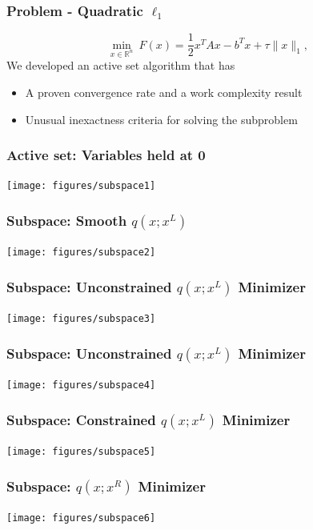 \documentclass{beamer}
\begin{document}
	\begin{frame}
		\frametitle{Problem - Quadratic $\ell_1$}
	\begin{equation*}
		\min_{x \in \mathbb{R}^n} \ F(x) = \frac{1}{2}x^T A x - b^T x +\tau \|x\|_1 ,
	\end{equation*}
	We developed an active set algorithm that has 
	\begin{itemize}
		\item A proven convergence rate and a work complexity result
		\item Unusual inexactness criteria for solving the subproblem 
	\end{itemize}
		\end{frame}


\begin{frame}
	\frametitle{Active set: Variables held at 0}
	\begin{center}
			\texttt{[image: figures/subspace1]}
	\end{center}
\end{frame}

\begin{frame}
	\frametitle{Subspace: Smooth $q(x;x^L)$}
		\begin{center}
				\texttt{[image: figures/subspace2]}
		\end{center}	
\end{frame}

\begin{frame}
	\frametitle{Subspace: Unconstrained $q(x;x^L)$ Minimizer}
		\begin{center}
				\texttt{[image: figures/subspace3]}
		\end{center}	
\end{frame}

\begin{frame}
	\frametitle{Subspace: Unconstrained $q(x;x^L)$ Minimizer}
		\begin{center}
				\texttt{[image: figures/subspace4]}
		\end{center}	
\end{frame}

\begin{frame}
	\frametitle{Subspace: Constrained $q(x;x^L)$ Minimizer}
		\begin{center}
				\texttt{[image: figures/subspace5]}
		\end{center}	
\end{frame}

\begin{frame}
	\frametitle{Subspace: $q(x;x^R)$ Minimizer }
		\begin{center}
				\texttt{[image: figures/subspace6]}
		\end{center}	
\end{frame}
           
\end{document}
